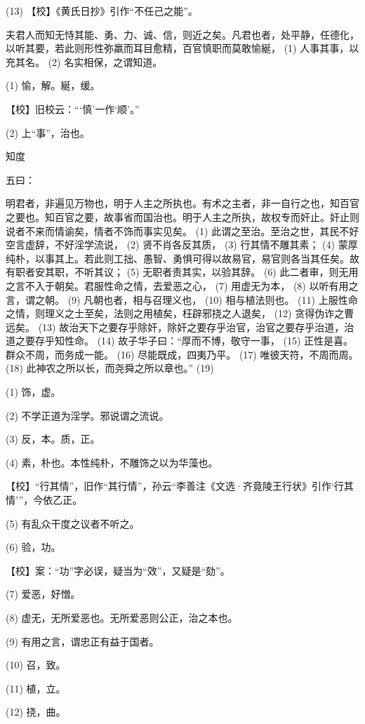 \documentclass[12pt,UTF8]{ctexbook}
\begin{document}
(13) 【校】《黄氏日抄》引作“不任己之能”。

夫君人而知无恃其能、勇、力、诚、信，则近之矣。凡君也者，处平静，任德化，以听其要，若此则形性弥羸而耳目愈精，百官慎职而莫敢愉綖， (1) 人事其事，以充其名。 (2) 名实相保，之谓知道。

(1) 愉，解。綖，缓。

【校】旧校云：“‘慎’一作‘顺’。”

(2) 上“事”，治也。





知度


五曰：

明君者，非遍见万物也，明于人主之所执也。有术之主者，非一自行之也，知百官之要也。知百官之要，故事省而国治也。明于人主之所执，故权专而奸止。奸止则说者不来而情谕矣，情者不饰而事实见矣。 (1) 此谓之至治。至治之世，其民不好空言虚辞，不好淫学流说， (2) 贤不肖各反其质， (3) 行其情不雕其素； (4) 蒙厚纯朴，以事其上。若此则工拙、愚智、勇惧可得以故易官，易官则各当其任矣。故有职者安其职，不听其议； (5) 无职者责其实，以验其辞。 (6) 此二者审，则无用之言不入于朝矣。君服性命之情，去爱恶之心， (7) 用虚无为本， (8) 以听有用之言，谓之朝。 (9) 凡朝也者，相与召理义也， (10) 相与植法则也。 (11) 上服性命之情，则理义之士至矣，法则之用植矣，枉辟邪挠之人退矣， (12) 贪得伪诈之曹远矣。 (13) 故治天下之要存乎除奸，除奸之要存乎治官，治官之要存乎治道，治道之要存乎知性命。 (14) 故子华子曰：“厚而不博，敬守一事， (15) 正性是喜。群众不周，而务成一能。 (16) 尽能既成，四夷乃平。 (17) 唯彼天符，不周而周。 (18) 此神农之所以长，而尧舜之所以章也。” (19)

(1) 饰，虚。

(2) 不学正道为淫学。邪说谓之流说。

(3) 反，本。质，正。

(4) 素，朴也。本性纯朴，不雕饰之以为华藻也。

【校】“行其情”，旧作“其行情”，孙云“李善注《文选·齐竟陵王行状》引作‘行其情’”，今依乙正。

(5) 有乱众干度之议者不听之。

(6) 验，功。

【校】案：“功”字必误，疑当为“效”，又疑是“劾”。

(7) 爱恶，好憎。

(8) 虚无，无所爱恶也。无所爱恶则公正，治之本也。

(9) 有用之言，谓忠正有益于国者。

(10) 召，致。

(11) 植，立。

(12) 挠，曲。
\end{document}
